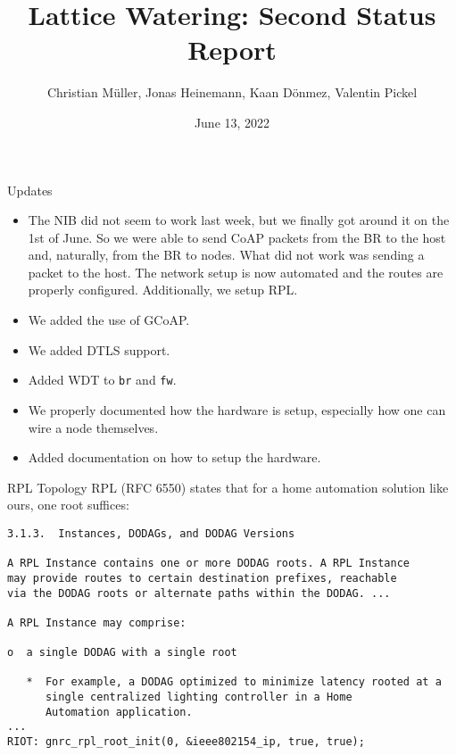 \documentclass[10pt, xcolor=svgnames]{beamer}
\title{Lattice Watering: Second Status Report}
\author{Christian Müller, Jonas Heinemann, Kaan Dönmez, Valentin Pickel}
\institute{
    Software Project on Internet Communication

    Summer Term 2022
    
    Freie Universität Berlin

    Institute for Computer Science
}
\date{June 13, 2022}
\begin{document}
\maketitle

\begin{frame}{Updates}
    \begin{itemize}
        \item The NIB did not seem to work last week, but we finally got around it on the 1st of June. So we were able to send CoAP packets from the BR to the host and, naturally, from the BR to nodes. What did not work was sending a packet to the host. The network setup is now automated and the routes are properly configured. Additionally, we setup RPL.
        \item We added the use of GCoAP.
        \item We added DTLS support.
        \item Added WDT to \texttt{br} and \texttt{fw}.
        \item We properly documented how the hardware is setup, especially how one can wire a node themselves.
        \item Added documentation on how to setup the hardware.
    \end{itemize}
\end{frame}

\begin{frame}[fragile]{RPL Topology}
    RPL (RFC 6550) states that for a home automation solution like ours, one root suffices:

    \begin{verbatim}
3.1.3.  Instances, DODAGs, and DODAG Versions

A RPL Instance contains one or more DODAG roots. A RPL Instance
may provide routes to certain destination prefixes, reachable
via the DODAG roots or alternate paths within the DODAG. ...

A RPL Instance may comprise:

o  a single DODAG with a single root

   *  For example, a DODAG optimized to minimize latency rooted at a
      single centralized lighting controller in a Home
      Automation application.
...
RIOT: gnrc_rpl_root_init(0, &ieee802154_ip, true, true);
    \end{verbatim}
\end{frame}
\end{document}
